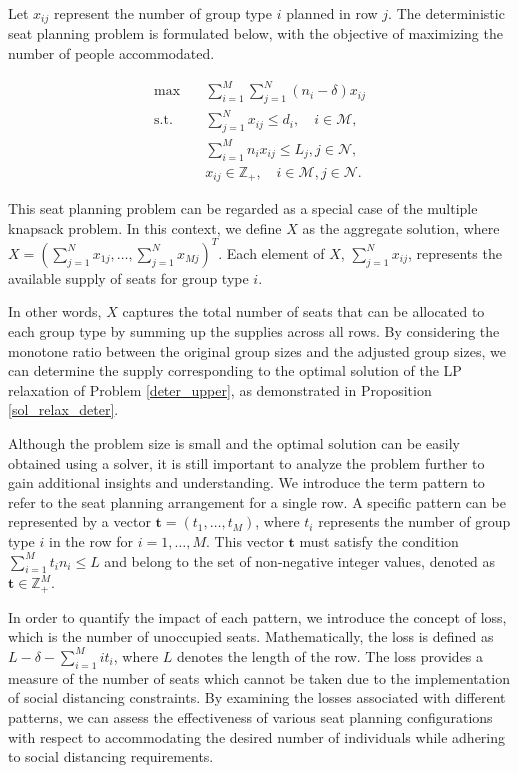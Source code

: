 Let $x_{ij}$ represent the number of group type $i$ planned in row $j$. The deterministic seat planning problem is formulated below, with the objective of maximizing the number of people accommodated.

\begin{equation}\label{deter_upper}
  \begin{aligned}
  \max \quad & \sum_{i=1}^{M}  \sum_{j= 1}^{N} (n_i- \delta) x_{ij} \\
  \text {s.t.} \quad & \sum_{j= 1}^{N} x_{ij} \leq d_{i}, \quad i \in \mathcal{M}, \\
  & \sum_{i=1}^{M} n_{i} x_{ij} \leq L_j, j \in \mathcal{N}, \\
  & x_{ij} \in \mathbb{Z}_{+}, \quad i \in \mathcal{M}, j \in \mathcal{N}.
  \end{aligned}
\end{equation}

This seat planning problem can be regarded as a special case of the multiple knapsack problem. In this context, we define $X$ as the aggregate solution, where $X = (\sum_{j=1}^{N} x_{1j}, \ldots, \sum_{j=1}^{N} x_{Mj})^T$. Each element of $X$, $\sum_{j=1}^{N} x_{ij}$, represents the available supply of seats for group type $i$. 


In other words, $X$ captures the total number of seats that can be allocated to each group type by summing up the supplies across all rows. By considering the monotone ratio between the original group sizes and the adjusted group sizes, we can determine the supply corresponding to the optimal solution of the LP relaxation of Problem \eqref{deter_upper}, as demonstrated in Proposition \ref{sol_relax_deter}.

Although the problem size is small and the optimal solution can be easily obtained using a solver, it is still important to analyze the problem further to gain additional insights and understanding.
We introduce the term pattern to refer to the seat planning arrangement for a single row. A specific pattern can be represented by a vector $\bm{t} = (t_1, \ldots, t_M)$, where $t_i$ represents the number of group type $i$ in the row for $i = 1,\ldots, M$. This vector $\bm{t}$ must satisfy the condition $\sum_{i=1}^{M} t_i n_i \leq L$ and belong to the set of non-negative integer values, denoted as $\bm{t} \in \mathbb{Z}_{+}^{M}$.

In order to quantify the impact of each pattern, we introduce the concept of loss, which is the number of unoccupied seats. Mathematically, the loss is defined as $L- \delta - \sum_{i =1}^{M} i t_i$, where $L$ denotes the length of the row. The loss provides a measure of the number of seats which cannot be taken due to the implementation of social distancing constraints. By examining the losses associated with different patterns, we can assess the effectiveness of various seat planning configurations with respect to accommodating the desired number of individuals while adhering to social distancing requirements.

